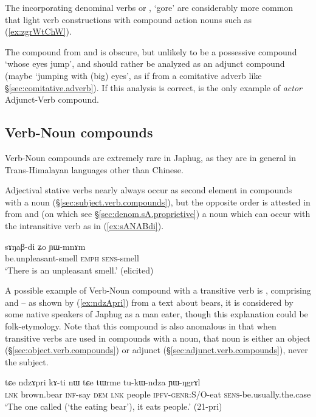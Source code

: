 The incorporating denominal verbs  or , `gore' are considerably more common that light verb constructions with compound action nouns such as (\ref{ex:zgrWtChW}).

The compound  from  and  is obscure, but unlikely to be a possessive compound `whose eyes jump', and should rather be analyzed as an adjunct compound (maybe `jumping with (big) eyes', as if from a comitative adverb like  §\ref{sec:comitative.adverb}). If this analysis is correct,  is the only example of \textit{actor} Adjunct-Verb compound.

\subsection{Verb-Noun compounds} \label{sec.v.n.compounds}
Verb-Noun compounds are extremely rare in Japhug, as they are in general in Trans-Himalayan languages other than Chinese. 

Adjectival stative verbs nearly always occur as second element in compounds with a noun (§\ref{sec:subject.verb.compounds}), but the opposite order is attested in  from  and  (on which see §\ref{sec:denom.sA.proprietive}) a noun which can occur with the intransitive verb  as in (\ref{ex:sANABdi}).

\begin{exe}
\ex \label{ex:sANABdi}
\gll sɤŋaβ-di ʑo ɲɯ-mnɤm \\
be.unpleasant-smell \textsc{emph} \textsc{sens}-smell \\
\glt `There is an unpleasant smell.' (elicited)
\end{exe}

A possible example of Verb-Noun compound with a transitive verb is , comprising  and  -- as shown by (\ref{ex:ndzApri}) from a text about bears, it is considered by some native speakers of Japhug as a man eater, though this explanation could be folk-etymology. Note that this compound is also anomalous in that when transitive verbs are used in compounds with a noun, that noun is either an object (§\ref{sec:object.verb.compounds}) or adjunct (§\ref{sec:adjunct.verb.compounds}), never the subject.

\begin{exe}
\ex \label{ex:ndzApri}
\gll tɕe ndzɤpri kɤ-ti nɯ tɕe tɯrme tu-kɯ-ndza ɲɯ-ŋgrɤl \\
\textsc{lnk} brown.bear \textsc{inf}-say \textsc{dem} \textsc{lnk} people \textsc{ipfv}-\textsc{genr}:S/O-eat \textsc{sens}-be.usually.the.case \\
\glt `The one called  (`the eating bear'), it eats people.' (21-pri)
\end{exe} 

